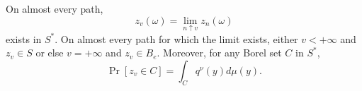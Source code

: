 On almost every path,
$$z_v(\omega) = \lim_{n \uparrow v} z_n(\omega)$$
exists in $S^*$. On almost every path for which the limit exists, either $v < +\infty$ and $z_v \in S$ or else $v = +\infty$ and $z_v \in B_e$. Moreover, for any Borel set $C$ in $S^*$,
$$\Pr[z_v \in C] = \int_C q^\nu(y) d\mu(y).$$
